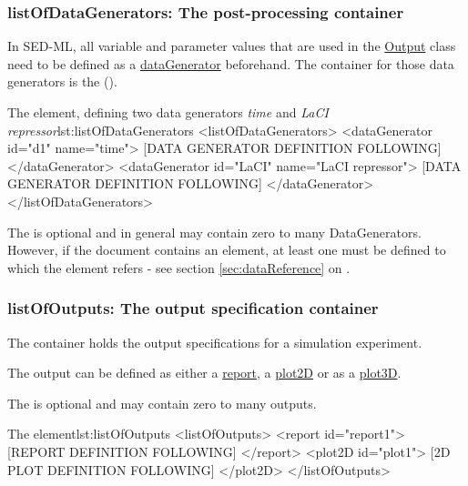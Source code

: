 \subsubsection{listOfDataGenerators: The post-processing container}
\label{sec:listOfDataGenerators}
In SED-ML, all variable and parameter values that are used in the \hyperref[class:output]{Output} class need to be defined as a \hyperref[class:dataGenerator]{dataGenerator} beforehand. The container for those data generators is the  ().



\begin{myXmlLst}{The  element, defining two data generators \emph{time} and \emph{LaCI repressor}}{lst:listOfDataGenerators}
<listOfDataGenerators>
	<dataGenerator id="d1" name="time">
		[DATA GENERATOR DEFINITION FOLLOWING]
	</dataGenerator>
	<dataGenerator id="LaCI" name="LaCI repressor">
		[DATA GENERATOR DEFINITION FOLLOWING]
	</dataGenerator>
</listOfDataGenerators>
\end{myXmlLst}

The  is optional and in general may contain zero to many DataGenerators. However, if the \currentLV document contains  an    element, at least one   must be defined to which the  element refers -  see section \ref{sec:dataReference} on .


\subsubsection{listOfOutputs: The output specification container}
\label{sec:listOfOutputs}
The  container holds the output specifications for a simulation experiment. 


The output can be defined as either a \hyperref[class:report]{report}, a \hyperref[class:plot2D]{plot2D} or as a \hyperref[class:plot3D]{plot3D}. 

The  is optional and may contain zero to many outputs.

\begin{myXmlLst}{The  element}{lst:listOfOutputs}
<listOfOutputs>
	<report id="report1">
		[REPORT DEFINITION FOLLOWING]
	</report>
	<plot2D id="plot1">
		[2D PLOT DEFINITION FOLLOWING] 
	</plot2D>
</listOfOutputs>
\end{myXmlLst}
